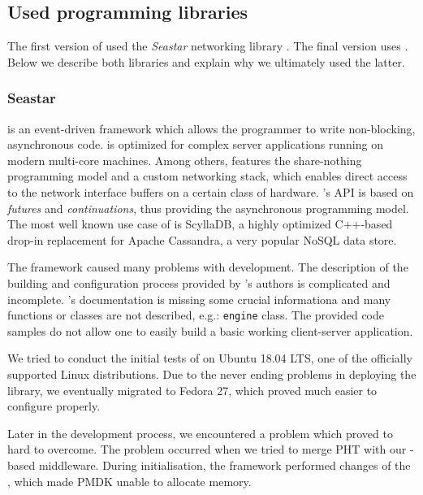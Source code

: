     \subsection{Used programming libraries}
        The first version of \DHTS used the \emph{Seastar} networking library \cite{??}. The final version uses \Asio\cite{Asio}. Below we describe both libraries and explain why we ultimately used the latter.
    
        \subsubsection{Seastar}
            \Seastar\cite{Seastar} is an event-driven framework which allows the programmer to write non-blocking, asynchronous code. \Seastar is optimized for complex server applications running on modern multi-core machines. Among others, \Seastar features the share-nothing programming model and a custom networking stack, which enables direct access to the network interface buffers on a certain class of hardware. \Seastar's API is based on \textit{futures} and \textit{continuations}, thus providing the asynchronous programming model. The most well known use case of \Seastar is ScyllaDB\cite{ScyllaDB}, a highly optimized C++-based drop-in replacement for Apache Cassandra\cite{Cassandra}, a very popular NoSQL data store.
            
            The \Seastar framework caused many problems with development. The description of the building and configuration process provided by \Seastar's authors is complicated and incomplete. \Seastar's  documentation is missing some crucial informationa and many functions or classes are not described, e.g.: \texttt{engine} class. The provided code samples do not allow one to easily build a basic working client-server application.
            
            We tried to conduct the initial tests of \Seastar on Ubuntu 18.04 LTS, one of the officially supported Linux distributions. Due to the never ending problems in deploying the library, we eventually migrated to Fedora 27, which proved much easier to configure properly. 
            
            Later in the development process, we encountered a problem which proved to hard to overcome. The problem occurred when we tried to merge PHT with our \Seastar-based middleware. During initialisation, the \Seastar framework performed changes of the  \cite{Hugepages}, which made PMDK unable to allocate memory.
            
